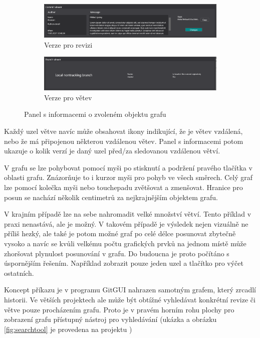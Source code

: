 \documentclass[
  biblatex,
  glossaries,
  index
]{kidiplom}
\begin{document}
\begin{figure}
\centering
\begin{subfigure}[b]{13cm}
   \includegraphics[width=1\linewidth]{commit-viewer.png}
   \caption{Verze pro revizi}

\vspace{5 mm}
\end{subfigure}
\begin{subfigure}[b]{13cm}
   \includegraphics[width=1\linewidth]{branch-viewer.png}
   \caption{Verze pro větev}
\end{subfigure}
\caption{Panel s informacemi o zvoleném objektu grafu}
\label{fig:item-info}
\end{figure}

Každý uzel větve navíc může obsahovat ikony indikující, že je větev vzdálená, nebo že má připojenou některou vzdálenou větev. Panel s informacemi potom ukazuje o kolik verzí je daný uzel před/za sledovanou vzdálenou větví.

V grafu se lze pohybovat pomocí myši po stisknutí a podržení pravého tlačítka v oblasti grafu. Znázorňuje to i kurzor myši pro pohyb ve všech směrech. Celý graf lze pomocí kolečka myši nebo touchepadu zvětšovat a zmenšovat. Hranice pro posun se nachází několik centimetrů za nejkrajnějším objektem grafu.

V krajním případě lze na sebe nahromadit velké množství větví. Tento příklad v praxi nenastává, ale je možný. V takovém případě je výsledek nejen vizuálně ne příliš hezký, ale také je potom možné graf po celé délce posunovat zbytečně vysoko a navíc se kvůli velkému počtu grafických prvků na jednom místě může zhoršovat plynulost posunování v grafu. Do budoucna je proto počítáno s úspornějším řešením. Například zobrazit pouze jeden uzel a tlačítko pro výčet ostatních.

Koncept příkazu  je v programu GitGUI nahrazen samotným grafem, který zrcadlí historii. Ve větších projektech ale může být obtížné vyhledávat konkrétní revize či větve pouze procházením grafu. Proto je v pravém horním rohu plochy pro zobrazení grafu přístupný nástroj pro vyhledávání (ukázka a obrázku \ref{fig:searchtool} je provedena na projektu \cite{libgitreference})
\end{document}
